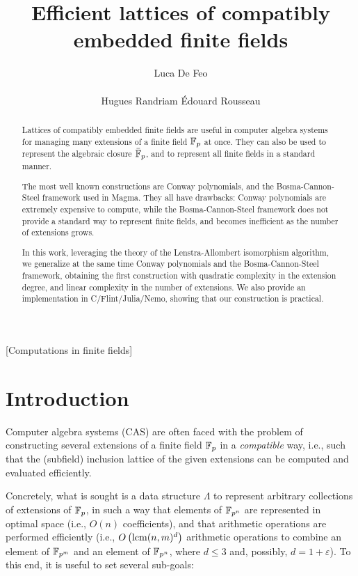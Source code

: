 \documentclass{sig-alternate}
\author{
  \alignauthor Luca De Feo\\
  \affaddr{Universit\'e Paris Saclay -- UVSQ, LMV}\\
  \email{luca.de-feo@uvsq.fr}
  \alignauthor Hugues Randriam
  \alignauthor \'Edouard Rousseau
}
\title{Efficient lattices of compatibly embedded finite fields}
\begin{document}
\maketitle

\begin{abstract}
  Lattices of compatibly embedded finite fields are useful in computer
  algebra systems for managing many extensions of a finite field
  $\mathbb{F}_p$ at once. %
  They can also be used to represent the algebraic closure $\bar{\mathbb{F}}_p$,
  and to represent all finite fields in a standard manner.

  The most well known constructions are Conway polynomials, and the
  Bosma-Cannon-Steel framework used in Magma. %
  They all have drawbacks: Conway polynomials are extremely expensive
  to compute, while the Bosma-Cannon-Steel framework does not provide
  a standard way to represent finite fields, and becomes inefficient
  as the number of extensions grows.

  In this work, leveraging the theory of the Lenstra-Allombert
  isomorphism algorithm, we generalize at the same time Conway
  polynomials and the Bosma-Cannon-Steel framework, obtaining the
  first construction with quadratic complexity in the extension
  degree, and linear complexity in the number of extensions. %
  We also provide an implementation in C/Flint/Julia/Nemo, showing
  that our construction is practical.
\end{abstract}

[Computations in finite fields]

\section{Introduction}
\label{sec:introduction}

Computer algebra systems (CAS) are often faced with the problem of
constructing several extensions of a finite field $\mathbb{F}_p$ in a
\emph{compatible} way, i.e., such that the (subfield) inclusion
lattice of the given extensions can be computed and evaluated
efficiently.

Concretely, what is sought is a data structure $\Lambda$ to represent
arbitrary collections of extensions of $\mathbb{F}_p$, in such a way that
elements of $\mathbb{F}_{p^n}$ are represented in optimal space (i.e., $O(n)$
coefficients), and that arithmetic operations are performed
efficiently (i.e., $O\left(\operatorname{lcm}(n,m)^d\right)$ arithmetic operations
to combine an element of $\mathbb{F}_{p^m}$ and an element of $\mathbb{F}_{p^n}$,
where $d\le 3$ and, possibly, $d=1+\varepsilon$). %
To this end, it is useful to set several sub-goals:
\end{document}
